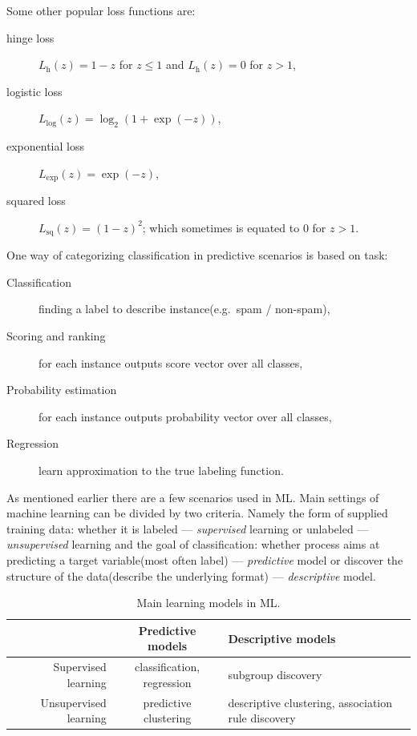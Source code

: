 \documentclass[12pt, a4paper, pdflatex, leqno]{report}
\begin{document}
Some other popular loss functions are:
\begin{description}
\item[hinge loss] $L_{\text{h}} (z) = 1 - z$ for $z \leq 1$ and $L_{\text{h}} (z) = 0$ for $z > 1$,
\item[logistic loss] $L_{\text{log}} (z) = \log_2 (1 + \exp(-z))$,
\item[exponential loss] $L_{\text{exp}} (z) = \exp(-z)$,
\item[squared loss] $L_{\text{sq}} (z) = (1 - z)^2$; which sometimes is equated to $0$ for $z>1$.\\
\end{description}

One way of categorizing classification in predictive scenarios is based on task:
\begin{description}
\item[Classification] finding a label to describe instance(e.g.\ spam / non-spam),
\item[Scoring and ranking] for each instance outputs score vector over all classes,
\item[Probability estimation] for each instance outputs probability vector over all classes,
\item[Regression] learn approximation to the true labeling function.\\
\end{description}

As mentioned earlier there are a few scenarios used in ML. Main settings of machine learning can be divided by two criteria. Namely the form of supplied training data: whether it is labeled --- \emph{supervised} learning or unlabeled --- \emph{unsupervised} learning and the goal of classification: whether process aims at predicting a target variable(most often label) --- \emph{predictive} model or discover the structure of the data(describe the underlying format) --- \emph{descriptive} model.\\

\begin{table}[htbp]
  \begin{tabular}{ r | c p{5cm} }
                         & Predictive models          & Descriptive models \\
    \hline
    Supervised learning   & classification, regression & subgroup discovery \\
    Unsupervised learning & predictive clustering      & descriptive clustering, association rule discovery \\
  \end{tabular}~\\[0.1cm]
  \caption{Main learning models in ML.\label{fig:learning_models}}
\end{table}~\\
\end{document}
